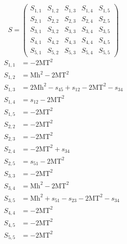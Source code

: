 \documentclass[a4paper]{article}
\begin{document}
\begin{equation}
S=\left(\begin{array}{ccccc}
   S_{1,1}&
   S_{1,2}&
   S_{1,3}&
   S_{1,4}&
   S_{1,5}\\
   S_{2,1}&
   S_{2,2}&
   S_{2,3}&
   S_{2,4}&
   S_{2,5}\\
   S_{3,1}&
   S_{3,2}&
   S_{3,3}&
   S_{3,4}&
   S_{3,5}\\
   S_{4,1}&
   S_{4,2}&
   S_{4,3}&
   S_{4,4}&
   S_{4,5}\\
   S_{5,1}&
   S_{5,2}&
   S_{5,3}&
   S_{5,4}&
   S_{5,5}\end{array}\right)
\end{equation}
\begin{subequations}
\begin{align}
   S_{1,1}&=-2\text{MT}^2\\
   S_{1,2}&=\text{Mh}^2-2\text{MT}^2\\
   S_{1,3}&=2\text{Mh}^2-s_{45}+s_{12}-2\text{MT}^2-s_{34}\\
   S_{1,4}&=s_{12}-2\text{MT}^2\\
   S_{1,5}&=-2\text{MT}^2\\
   S_{2,2}&=-2\text{MT}^2\\
   S_{2,3}&=-2\text{MT}^2\\
   S_{2,4}&=-2\text{MT}^2+s_{34}\\
   S_{2,5}&=s_{51}-2\text{MT}^2\\
   S_{3,3}&=-2\text{MT}^2\\
   S_{3,4}&=\text{Mh}^2-2\text{MT}^2\\
   S_{3,5}&=\text{Mh}^2+s_{51}-s_{23}-2\text{MT}^2-s_{34}\\
   S_{4,4}&=-2\text{MT}^2\\
   S_{4,5}&=-2\text{MT}^2\\
   S_{5,5}&=-2\text{MT}^2
\end{align}
\end{subequations}
\end{document}
